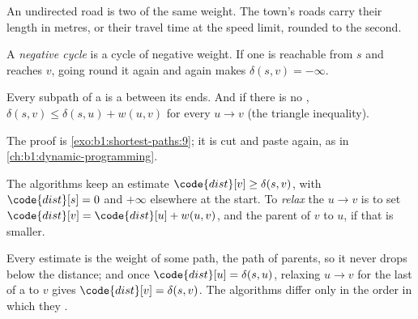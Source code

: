An undirected road is two  of the same weight. The town's roads carry their length in metres, or their travel time
at the speed limit, rounded to the second.

\label{lst:b1:shortest-paths:wgraph}

\label{out:b1:shortest-paths:wgraph}

\begin{definition}\label{def:b1:shortest-paths:negative}
A \emph{negative cycle} is a cycle of negative weight. If one is reachable from $s$ and reaches
$v$, going round it again and again makes $\delta(s, v) = -\infty$.
\end{definition}

\begin{proposition}\label{prop:b1:shortest-paths:subpath}
Every subpath of a  is a  between its ends. And if there is no , $\delta(s, v)
\leq \delta(s, u) + w(u, v)$ for every  $u \to v$ (the triangle inequality).
\end{proposition}

The proof is \cref{exo:b1:shortest-paths:9}; it is cut and paste again, as in \cref{ch:b1:dynamic-programming}.

\begin{definition}[Relaxation]\label{def:b1:shortest-paths:relaxation}
The algorithms keep an estimate $\code{dist}[v] \geq \delta(s, v)$, with $\code{dist}[s] = 0$ and $+\infty$ elsewhere at
the start. To \emph{relax} the  $u \to v$ is to set $\code{dist}[v] = \code{dist}[u] +
w(u, v)$, and the parent of $v$ to $u$, if that is smaller.
\end{definition}

Every estimate is the weight of some path, the path of parents, so it never drops below the distance; and once
$\code{dist}[u] = \delta(s, u)$, relaxing $u \to v$ for the last  of a  to $v$ gives $\code{dist}[v] =
\delta(s, v)$. The algorithms differ only in the order in which they  .

